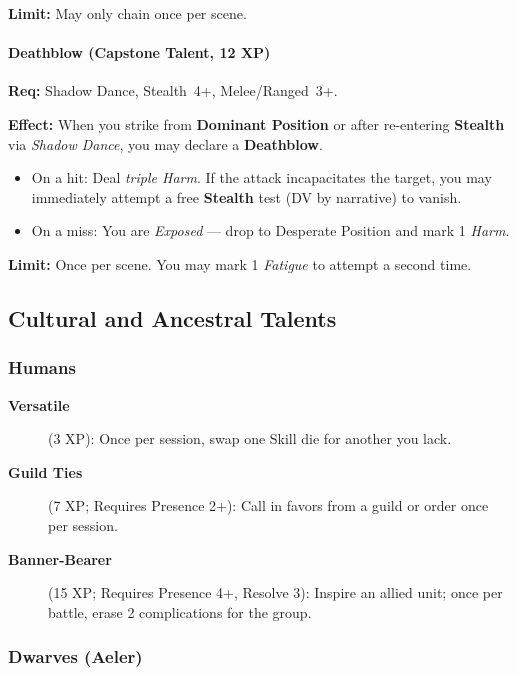 \textbf{Limit:} May only chain once per scene.   

\paragraph{Deathblow (Capstone Talent, 12 XP)}  
\textbf{Req:} Shadow Dance, Stealth~4+, Melee/Ranged~3+.  

\textbf{Effect:} When you strike from \textbf{Dominant Position} or after re-entering \textbf{Stealth} via \emph{Shadow Dance}, you may declare a \textbf{Deathblow}.  
\begin{itemize}
  \item On a hit: Deal \emph{triple Harm}. If the attack incapacitates the target, you may immediately attempt a free \textbf{Stealth} test (DV by narrative) to vanish.  
  \item On a miss: You are \emph{Exposed} — drop to Desperate Position and mark 1 \emph{Harm}.  
\end{itemize}  

\textbf{Limit:} Once per scene. You may mark 1 \emph{Fatigue} to attempt a second time.  

\subsection{Cultural and Ancestral Talents}
\label{subsec:cultural-talents}

\subsubsection{Humans}
\label{subsubsec:human-talents}

\begin{description}
\item[\textbf{Versatile}] (3 XP): Once per session, swap one Skill die for another you lack.
\item[\textbf{Guild Ties}] (7 XP; Requires Presence 2+): Call in favors from a guild or order once per session.
\item[\textbf{Banner-Bearer}] (15 XP; Requires Presence 4+, Resolve 3): Inspire an allied unit; once per battle, erase 2 complications for the group.
\end{description}

\subsubsection{Dwarves (Aeler)}
\label{subsubsec:dwarf-talents}

